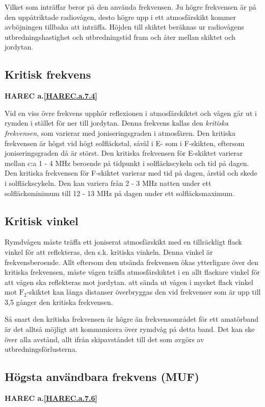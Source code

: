 Vilket som inträffar beror på den använda frekvensen. Ju högre
frekvensen är på den uppåtriktade radiovågen, desto högre upp i ett
atmosfärskikt kommer avböjningen tillbaka att inträffa. Höjden till
skiktet beräknas ur radiovågens utbredningshastighet och
utbredningstid fram och åter mellan skiktet och jordytan.

\subsection{Kritisk frekvens}
\textbf{
HAREC a.\ref{HAREC.a.7.4}\label{myHAREC.a.7.4}
}

Vid en viss övre frekvens upphör reflexionen i atmosfärskiktet och
vågen går ut i rymden i stället för ner till jordytan. Denna frekvens
kallas den \emph{kritiska frekvensen}, som varierar med
joniseringsgraden i atmosfären. Den kritiska frekvensen är högst vid
högt solfläckstal, såväl i E- som i F-skikten, eftersom
joniseringsgraden då är störst. Den kritiska frekvensen för E-skiktet
varierar mellan c:a 1 - 4 MHz beroende på tidpunkt i solfläckscykeln
och tid på dagen. Den kritiska frekvensen för F-skiktet varierar med
tid på dagen, årstid och skede i solfläckscykeln.  Den kan variera
från 2 - 3 MHz natten under ett solfläcksminimum till 12 - 13 MHz på
dagen under ett solfläcksmaximum.

\subsection{Kritisk vinkel}

Rymdvågen måste träffa ett joniserat atmosfärskikt med en tillräckligt
flack vinkel för att reflekteras, den s.k. kritiska vinkeln. Denna
vinkel är frekvensberoende. Allt eftersom den utsända frekvensen ökas
ytterligare över den kritiska frekvensen, måste vågen träffa
atmosfärskiktet i en allt flackare vinkel för att vågen ska
reflekteras mot jordytan.  att sända ut vågen i mycket flack vinkel
mot \(\mathrm{F_2}\)-skiktet kan långa distanser överbryggas den vid
frekvenser som är upp till 3,5 gånger den kritiska frekvensen.

Så snart den kritiska frekvensen är högre än frekvensområdet för ett
amatörband är det alltså möjligt att kommunicera över rymdvåg på detta
band. Det kan ske över alla avstånd, allt ifrån skipavståndet till det
som avgörs av utbredningsförlusterna.

\subsection{Högsta användbara frekvens (MUF)}
\textbf{
HAREC a.\ref{HAREC.a.7.6}\label{myHAREC.a.7.6}
}

